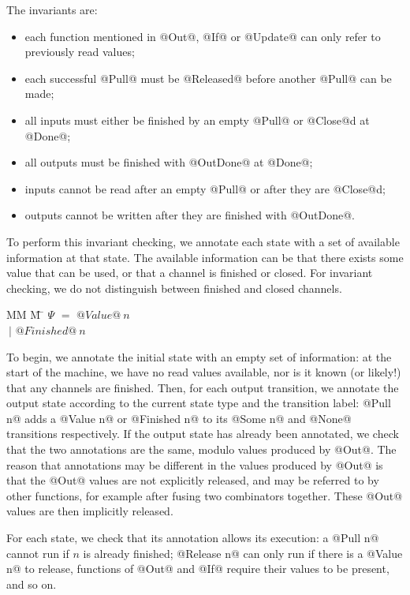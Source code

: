 The invariants are:
\begin{itemize}
\item each function mentioned in @Out@, @If@ or @Update@ can only refer to previously read values;
\item each successful @Pull@ must be @Released@ before another @Pull@ can be made;
\item all inputs must either be finished by an empty @Pull@ or @Close@d at @Done@;
\item all outputs must be finished with @OutDone@ at @Done@;
\item inputs cannot be read after an empty @Pull@ or after they are @Close@d;
\item outputs cannot be written after they are finished with @OutDone@.
\end{itemize}

To perform this invariant checking, we annotate each state with a set of available information at that state.
The available information can be that there exists some value that can be used, or that a channel is finished or closed.
For invariant checking, we do not distinguish between finished and closed channels.

\begin{tabbing}
MM \= M \= \kill
$\Psi$ \> $=$  \> $@Value@~n$ \\
       \> $~|$ \> $@Finished@~n$ \\
\end{tabbing}

To begin, we annotate the initial state with an empty set of information: at the start of the machine, we have no read values available, nor is it known (or likely!) that any channels are finished.
Then, for each output transition, we annotate the output state according to the current state type and the transition label: @Pull n@ adds a @Value n@ or @Finished n@ to its @Some n@ and @None@ transitions respectively.
If the output state has already been annotated, we check that the two annotations are the same, modulo values produced by @Out@.
The reason that annotations may be different in the values produced by @Out@ is that the @Out@ values are not explicitly released, and may be referred to by other functions, for example after fusing two combinators together.
These @Out@ values are then implicitly released.

For each state, we check that its annotation allows its execution: a @Pull n@ cannot run if $n$ is already finished; @Release n@ can only run if there is a @Value n@ to release, functions of @Out@ and @If@ require their values to be present, and so on.

